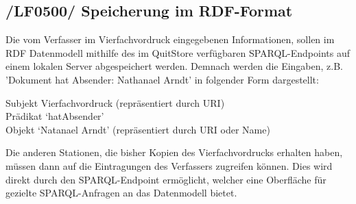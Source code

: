 \subsection{/LF0500/ Speicherung im RDF-Format}
Die vom Verfasser im Vierfachvordruck eingegebenen Informationen, sollen im RDF Datenmodell mithilfe des im QuitStore verfügbaren SPARQL-Endpoints auf einem lokalen Server abgespeichert werden. Demnach werden die Eingaben, z.B. 'Dokument hat Absender: Nathanael Arndt' in folgender Form dargestellt:
\begin{flushleft}
\quad \quad \quad Subjekt Vierfachvordruck (repräsentiert durch URI) \\
\quad \quad \quad Prädikat `hatAbsender' \\
\quad \quad \quad Objekt `Natanael Arndt' (repräsentiert durch URI oder Name)
\end{flushleft}
Die anderen Stationen, die bisher Kopien des Vierfachvordrucks erhalten haben, müssen dann auf die Eintragungen des Verfassers zugreifen können. Dies wird direkt durch den SPARQL-Endpoint ermöglicht, welcher eine Oberfläche für gezielte SPARQL-Anfragen an das Datenmodell bietet.